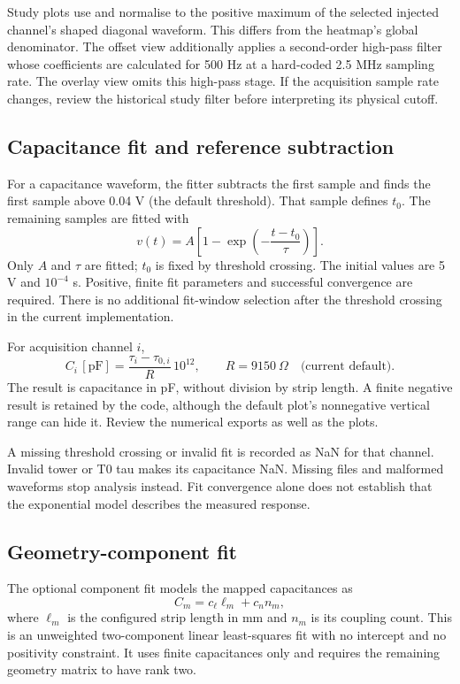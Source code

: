 Study plots use  and normalise to the positive maximum of the selected injected channel's shaped diagonal waveform. This differs from the heatmap's global denominator. The offset view additionally applies a second-order high-pass filter whose coefficients are calculated for 500 Hz at a hard-coded 2.5 MHz sampling rate. The overlay view omits this high-pass stage. If the acquisition sample rate changes, review the historical study filter before interpreting its physical cutoff.

\subsection{Capacitance fit and reference subtraction}
For a capacitance waveform, the fitter subtracts the first sample and finds the first sample above 0.04 V (the default threshold). That sample defines $t_0$. The remaining samples are fitted with
\begin{equation}
 v(t)=A\left[1-\exp\left(-\frac{t-t_0}{\tau}\right)\right].
\end{equation}
Only $A$ and $\tau$ are fitted; $t_0$ is fixed by threshold crossing. The initial values are 5 V and $10^{-4}$ s. Positive, finite fit parameters and successful convergence are required. There is no additional fit-window selection after the threshold crossing in the current implementation.

For acquisition channel $i$,
\begin{equation}
 C_i\,[\mathrm{pF}]=\frac{\tau_i-\tau_{0,i}}{R}\,10^{12},
 \qquad R=9150\ \Omega\quad\text{(current default)}.
\end{equation}
The result is capacitance in pF, without division by strip length. A finite negative result is retained by the code, although the default plot's nonnegative vertical range can hide it. Review the numerical exports as well as the plots.

A missing threshold crossing or invalid fit is recorded as NaN for that channel. Invalid tower or T0 tau makes its capacitance NaN. Missing files and malformed waveforms stop analysis instead. Fit convergence alone does not establish that the exponential model describes the measured response.

\subsection{Geometry-component fit}
The optional component fit models the mapped capacitances as
\begin{equation}
 C_m=c_{\ell}\ell_m+c_n n_m,
\end{equation}
where $\ell_m$ is the configured strip length in mm and $n_m$ is its coupling count. This is an unweighted two-component linear least-squares fit with no intercept and no positivity constraint. It uses finite capacitances only and requires the remaining geometry matrix to have rank two.

